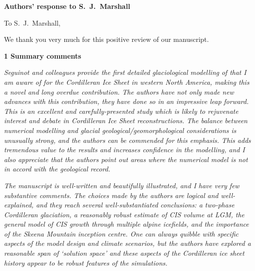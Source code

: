 


\textbf{Authors' response to S.~J.~Marshall}
\bigskip


\newcommand{\sechead}[1]{\bigskip\noindent\textbf{#1}}
\newcommand{\referee}[1]{\bigskip\textcolor{journalname}{\textit{#1}}}
\newcommand{\msquote}[1]{\begin{quote}\textit{#1}\end{quote}}

To S.~J.~Marshall,

We thank you very much for this positive review of our manuscript.


\sechead{1 \quad Summary comments}

\referee{%
    Seguinot and colleagues provide the first detailed glaciological modelling
    of that I am aware of for the Cordilleran Ice Sheet in western North
    America, making this a novel and long overdue contribution. The authors
    have not only made new advances with this contribution, they have done so
    in an impressive leap forward. This is an excellent and carefully-presented
    study which is likely to rejuvenate interest and debate in Cordilleran Ice
    Sheet reconstructions. The balance between numerical modelling and glacial
    geological/geomorphological considerations is unusually strong, and the
    authors can be commended for this emphasis. This adds tremendous value to
    the results and increases confidence in the modelling, and I also
    appreciate that the authors point out areas where the numerical model is
    not in accord with the geological record.}

\referee{%
    The manuscript is well-written and beautifully illustrated, and I have very
    few substantive comments. The choices made by the authors are logical and
    well-explained, and they reach several well-substantiated conclusions: a
    two-phase Cordilleran glaciation, a reasonably robust estimate of CIS
    volume at LGM, the general model of CIS growth through multiple alpine
    icefields, and the importance of the Skeena Mountain inception centre. One
    can always quibble with specific aspects of the model design and climate
    scenarios, but the authors have explored a reasonable span of `solution
    space' and these aspects of the Cordilleran ice sheet history appear to be
    robust features of the simulations.}

